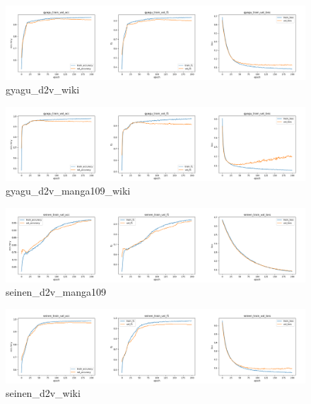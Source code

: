 \documentclass[twocolumn]{jarticle}     %
\begin{document}
\begin{figure}[h]
  \begin{center} %
    \includegraphics[width=14.0cm]{gyagu_d2v_wiki.png}
    \caption{gyagu\_d2v\_wiki} %
    \label{fig:gyagu_d2v_wiki} %
  \end{center}
\end{figure}

\begin{figure}[h]
  \begin{center} %
    \includegraphics[width=14.0cm]{gyagu_d2v_manga109_wiki.png}
    \caption{gyagu\_d2v\_manga109\_wiki} %
    \label{fig:gyagu_d2v_manga109_wiki} %
  \end{center}
\end{figure}

\clearpage

\begin{figure}[h]
  \begin{center} %
    \includegraphics[width=14.0cm]{seinen_manga109.png}
    \caption{seinen\_d2v\_manga109} %
    \label{fig:seinen_d2v_manga109} %
  \end{center}
\end{figure}

\begin{figure}[h]
  \begin{center} %
    \includegraphics[width=14.0cm]{seinen_wiki.png}
    \caption{seinen\_d2v\_wiki} %
    \label{fig:seinen_d2v_wiki} %
  \end{center}
\end{figure}
\end{document}
